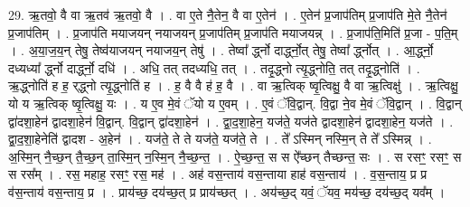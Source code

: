\documentclass[17pt]{extarticle}
\begin{document}
29. ऋ॒तवो॒ वै वा ऋ॒तव॑ ऋ॒तवो॒ वै । . वा ए॒ते नै॒तेन॒ वै वा ए॒तेन॑ । . ए॒तेन॑ प्र॒जाप॑तिम् प्र॒जाप॑ति मे॒ते नै॒तेन॑ प्र॒जाप॑तिम् । . प्र॒जाप॑ति मयाजयन् नयाजयन् प्र॒जाप॑तिम् प्र॒जाप॑ति मयाजयन्न् । . प्र॒जाप॑ति॒मिति॑ प्र॒जा - प॒ति॒म् । . अ॒या॒ज॒य॒न् तेषु॒ तेष्व॑याजयन् नयाजय॒न् तेषु॑ । . तेष्वा᳚ र्द्ध्नो दार्द्ध्नो॒त् तेषु॒ तेष्वा᳚ र्द्ध्नोत् । . आ॒र्द्ध्नो॒ दध्यध्या᳚ र्द्ध्नो दार्द्ध्नो॒ दधि॑ । . अधि॒ तत् तदध्यधि॒ तत् । . तदृ॒द्ध्नो त्यृ॒द्ध्नोति॒ तत् तदृ॒द्ध्नोति॑ । . ऋ॒द्ध्नोति॑ ह ह॒ र्‌द्ध्नो त्यृ॒द्ध्नोति॑ ह । . ह॒ वै वै ह॑ ह॒ वै । . वा ऋ॒त्विक् ष्वृ॒त्विक्षु॒ वै वा ऋ॒त्विक्षु॑ । . ऋ॒त्विक्षु॒ यो य ऋ॒त्विक् ष्वृ॒त्विक्षु॒ यः । . य ए॒व मे॒वं ॅयो य ए॒वम् । . ए॒वं ॅवि॒द्वान्. वि॒द्वा ने॒व मे॒वं ॅवि॒द्वान् । . वि॒द्वान् द्वा॑दशा॒हेन॑ द्वादशा॒हेन॑ वि॒द्वान्. वि॒द्वान् द्वा॑दशा॒हेन॑ । . द्वा॒द॒शा॒हेन॒ यज॑ते॒ यज॑ते द्वादशा॒हेन॑ द्वादशा॒हेन॒ यज॑ते । . द्वा॒द॒शा॒हेनेति॑ द्वादश - अ॒हेन॑ । . यज॑ते॒ ते ते यज॑ते॒ यज॑ते॒ ते । . ते᳚ ऽस्मिन् नस्मि॒न् ते ते᳚ ऽस्मिन्न् । . अ॒स्मि॒न् नै॒च्छ॒न् तै॒च्छ॒न् ता॒स्मि॒न् न॒स्मि॒न् नै॒च्छ॒न्त॒ । . ऐ॒च्छ॒न्त॒ स स ऐ᳚च्छन् तैच्छन्त॒ सः । . स रसꣳ॒॒ रसꣳ॒॒ स स रस᳚म् । . रस॒ महाह॒ रसꣳ॒॒ रस॒ मह॑ । . अह॑ वस॒न्ताय॑ वस॒न्ताया हाह॑ वस॒न्ताय॑ । . व॒स॒न्ताय॒ प्र प्र व॑स॒न्ताय॑ वस॒न्ताय॒ प्र । . प्राय॑च्छ॒ दय॑च्छ॒त् प्र प्राय॑च्छत् । . अय॑च्छ॒द् यवं॒ ॅयव॒ मय॑च्छ॒ दय॑च्छ॒द् यव᳚म् । \newline
\end{document}
